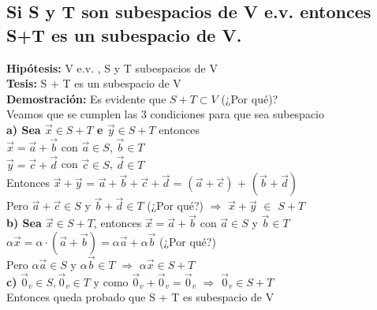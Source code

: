 \documentclass[11pt]{article}
\begin{document}
\subsection{Si S y T son subespacios de V e.v. entonces S+T es un
subespacio de V.}
{\bfseries {Hipótesis:}} V e.v. , S y T subespacios de V \\
{\bfseries {Tesis:}} S + T es un subespacio de V\\
{\bfseries {Demostración:}} Es evidente que $S + T \subset V$ (¿Por qué)?\\
Veamos que se cumplen las 3 condiciones para que sea subespacio\\
{\bfseries {a) Sea $\vec{x} \in S+T$ e $\vec{y} \in S+T$}} entonces\\
$\vec{x} = \vec{a} + \vec{b}$ con $\vec{a} \in S$, $\vec{b} \in T$\\
$\vec{y} = \vec{c} + \vec{d}$ con $\vec{c} \in S$, $\vec{d} \in T$\\
Entonces $\vec{x} + \vec{y}$ = $\vec{a}+\vec{b}+\vec{c}+\vec{d}$ = $(\vec{a} + \vec{c}) $ + $(\vec{b} + \vec{d})$\\
Pero $\vec{a}+\vec{c} \in S$ y $\vec{b}+\vec{d} \in T$ (¿Por qué?) $\Rightarrow$ $\vec{x} + \vec{y} $ $\in$ $ S + T $ \\
{\bfseries {b) Sea $\vec{x} \in S+T$}}, entonces $\vec{x} = \vec{a} + \vec{b} $ con $ \vec{a} \in S$ y $\vec{b} \in T$\\
$\alpha\vec{x} = \alpha\cdot (\vec{a} + \vec{b}) = \alpha\vec{a} + \alpha\vec{b}$ (¿Por qué?)\\
Pero $\alpha\vec{a} \in S$ y $\alpha\vec{b} \in T$ $\Rightarrow$ $\alpha\vec{x} \in S+T$\\
{\bfseries {c)}} $\vec{0}_v \in S, \vec{0}_v \in T$ y como $\vec{0}_v + \vec{0}_v = \vec{0}_v$ $\Rightarrow$ $\vec{0}_v \in S+T$\\
Entonces queda probado que S + T es subespacio de V
\end{document}
